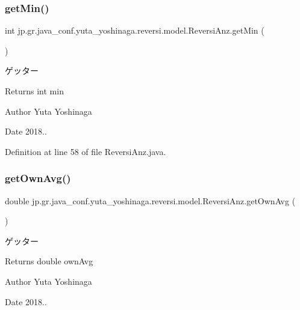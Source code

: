 \subsubsection{\texorpdfstring{get\+Min()}{getMin()}}
{\footnotesize\ttfamily int jp.\+gr.\+java\+\_\+conf.\+yuta\+\_\+yoshinaga.\+reversi.\+model.\+Reversi\+Anz.\+get\+Min (\begin{DoxyParamCaption}{ }\end{DoxyParamCaption})}



ゲッター 

\begin{DoxyReturn}{Returns}
int min 
\end{DoxyReturn}
\begin{DoxyAuthor}{Author}
Yuta Yoshinaga 
\end{DoxyAuthor}
\begin{DoxyDate}{Date}
2018.. 
\end{DoxyDate}


Definition at line 58 of file Reversi\+Anz.\+java.

\mbox{\label{classjp_1_1gr_1_1java__conf_1_1yuta__yoshinaga_1_1reversi_1_1model_1_1_reversi_anz_ac4f81a2452f38fa4078195aa970527fb}} 
\subsubsection{\texorpdfstring{get\+Own\+Avg()}{getOwnAvg()}}
{\footnotesize\ttfamily double jp.\+gr.\+java\+\_\+conf.\+yuta\+\_\+yoshinaga.\+reversi.\+model.\+Reversi\+Anz.\+get\+Own\+Avg (\begin{DoxyParamCaption}{ }\end{DoxyParamCaption})}



ゲッター 

\begin{DoxyReturn}{Returns}
double own\+Avg 
\end{DoxyReturn}
\begin{DoxyAuthor}{Author}
Yuta Yoshinaga 
\end{DoxyAuthor}
\begin{DoxyDate}{Date}
2018.. 
\end{DoxyDate}


